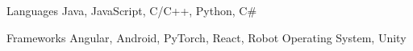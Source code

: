 
\begin{cvskills}
  \cvskill
    {Languages} %
    {Java, JavaScript, C/C++, Python, C\#} %

  \cvskill
    {Frameworks} %
    {Angular, Android, PyTorch, React, Robot Operating System, Unity} %
\end{cvskills}
